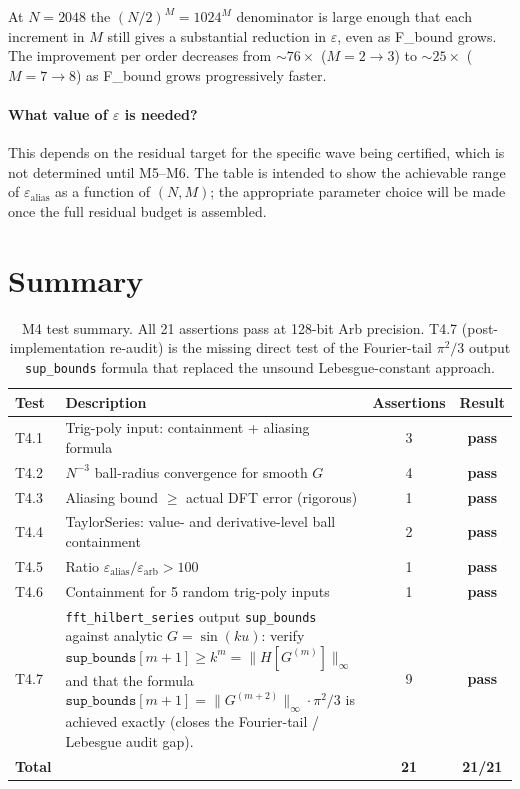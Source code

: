 \documentclass[11pt]{article}
\theoremstyle{definition}
\begin{document}
At $N=2048$ the $(N/2)^M = 1024^M$ denominator is large enough that each
increment in $M$ still gives a substantial reduction in $\varepsilon$, even
as F\_bound grows.
The improvement per order decreases from $\sim 76\times$ ($M=2\to3$) to
$\sim 25\times$ ($M=7\to8$) as F\_bound grows progressively faster.

\paragraph{What value of $\varepsilon$ is needed?}
This depends on the residual target for the specific wave being certified, which is not
determined until M5--M6.  The table is intended to show the achievable range of
$\varepsilon_{\mathrm{alias}}$ as a function of $(N,M)$; the appropriate parameter
choice will be made once the full residual budget is assembled.

\section{Summary}

\begin{table}[H]
\centering
\begin{tabular}{llcc}
\toprule
Test & Description & Assertions & Result \\
\midrule
T4.1 & Trig-poly input: containment + aliasing formula & 3 &
  \textcolor{green!60!black}{\textbf{pass}} \\
T4.2 & $N^{-3}$ ball-radius convergence for smooth $G$ & 4 &
  \textcolor{green!60!black}{\textbf{pass}} \\
T4.3 & Aliasing bound $\ge$ actual DFT error (rigorous) & 1 &
  \textcolor{green!60!black}{\textbf{pass}} \\
T4.4 & TaylorSeries: value- and derivative-level ball containment & 2 &
  \textcolor{green!60!black}{\textbf{pass}} \\
T4.5 & Ratio $\varepsilon_{\mathrm{alias}}/\varepsilon_{\mathrm{arb}} > 100$ & 1 &
  \textcolor{green!60!black}{\textbf{pass}} \\
T4.6 & Containment for 5 random trig-poly inputs & 1 &
  \textcolor{green!60!black}{\textbf{pass}} \\
T4.7 & \texttt{fft\_hilbert\_series} output \texttt{sup\_bounds} against analytic
       $G = \sin(ku)$: verify $\texttt{sup\_bounds}[m+1] \ge k^m = \|H[G^{(m)}]\|_\infty$
       and that the formula $\texttt{sup\_bounds}[m+1] = \|G^{(m+2)}\|_\infty \cdot \pi^2/3$
       is achieved exactly (closes the Fourier-tail / Lebesgue audit gap). & 9 &
  \textcolor{green!60!black}{\textbf{pass}} \\
\midrule
\textbf{Total} & & \textbf{21} & \textcolor{green!60!black}{\textbf{21/21}} \\
\bottomrule
\end{tabular}
\caption{M4 test summary. All 21 assertions pass at 128-bit Arb precision.
T4.7 (post-implementation re-audit) is the missing direct test of the
Fourier-tail $\pi^2/3$ output \texttt{sup\_bounds} formula that replaced the
unsound Lebesgue-constant approach.}
\end{table}
\end{document}
